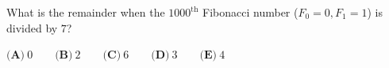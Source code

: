 What is the remainder when the $1000^\text{th}$ Fibonacci number ($F_0=0,F_1=1$) is divided by $7$?

$\textbf{(A)}~0\qquad\textbf{(B)}~2\qquad\textbf{(C)}~6\qquad\textbf{(D)}~3\qquad\textbf{(E)}~4\qquad$
